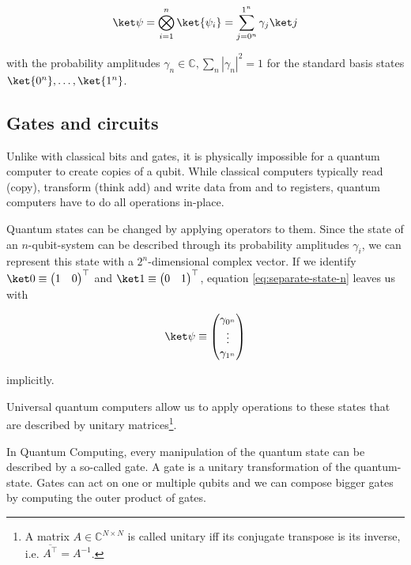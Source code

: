 \begin{equation}
    \label{eq:separate-state-n}
    \ket\psi = \bigotimes_{i=1}^n \ket{\psi_i} = \sum_{j=0^n}^{1^n} \gamma_j \ket j
\end{equation}

with the probability amplitudes
$\gamma_n \in \mathbb C, \sum_n \left|\gamma_n\right|^2 = 1$ for the standard
basis states $\ket{0^n}, \dots, \ket{1^n}$.

\subsection{Gates and circuits}

Unlike with classical bits and gates, it is physically impossible for a quantum
computer to create copies of a qubit.
While classical computers typically read (copy), transform (think add) and write
data from and to registers, quantum computers have to do all operations
in-place.

Quantum states can be changed by applying operators to them.
Since the state of an $n$-qubit-system can be described through its probability
amplitudes $\gamma_i$, we can represent this state with a $2^n$-dimensional
complex vector.
If we identify $\ket 0 \equiv \begin{pmatrix}1 & 0\end{pmatrix}^\top$ and
$\ket 1 \equiv \begin{pmatrix}0 & 1\end{pmatrix}^\top$,
equation \ref{eq:separate-state-n} leaves us with

\begin{equation}
    \ket\psi \equiv \begin{pmatrix} \gamma_{0^n} \\ \vdots \\ \gamma_{1^n}\end{pmatrix}
\end{equation}

implicitly.

Universal quantum computers allow us to apply operations to these states that
are described by unitary matrices\footnote{
    A matrix $A \in \mathbb{C}^{N \times N}$ is called unitary iff its conjugate
    transpose is its inverse, i.e. $\overline{A^\top} = A^{-1}$.
}.

In Quantum Computing, every manipulation of the quantum state can be described
by a so-called gate.
A gate is a unitary transformation of the quantum-state.
Gates can act on one or multiple qubits and we can compose bigger gates by
computing the outer product of gates.

